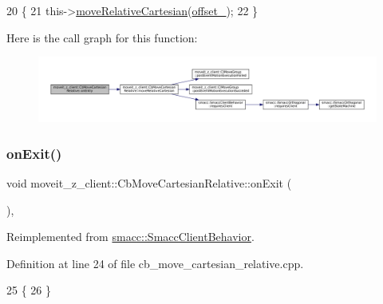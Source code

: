 \begin{DoxyCode}
20 \{
21     this->\hyperlink{classmoveit__z__client_1_1CbMoveCartesianRelative_aeffc7467b010f64ace4c7e7f699e6055}{moveRelativeCartesian}(\hyperlink{classmoveit__z__client_1_1CbMoveCartesianRelative_aa5316f2f734336722a353a8e9addea95}{offset\_});
22 \}
\end{DoxyCode}
Here is the call graph for this function\+:
\nopagebreak
\begin{figure}[H]
\begin{center}
\leavevmode
\includegraphics[width=350pt]{classmoveit__z__client_1_1CbMoveCartesianRelative_aaea0e6c7431f93301a77269b8fa539f8_cgraph}
\end{center}
\end{figure}
\mbox{\label{classmoveit__z__client_1_1CbMoveCartesianRelative_a539af37d16cffdc51127c7a5206504cb}} 
\subsubsection{\texorpdfstring{on\+Exit()}{onExit()}}
{\footnotesize\ttfamily void moveit\+\_\+z\+\_\+client\+::\+Cb\+Move\+Cartesian\+Relative\+::on\+Exit (\begin{DoxyParamCaption}{ }\end{DoxyParamCaption})\hspace{0.3cm}{\ttfamily [override]}, {\ttfamily [virtual]}}



Reimplemented from \hyperlink{classsmacc_1_1SmaccClientBehavior_ac0cd72d42bd00425362a97c9803ecce5}{smacc\+::\+Smacc\+Client\+Behavior}.



Definition at line 24 of file cb\+\_\+move\+\_\+cartesian\+\_\+relative.\+cpp.


\begin{DoxyCode}
25 \{
26 \}
\end{DoxyCode}


